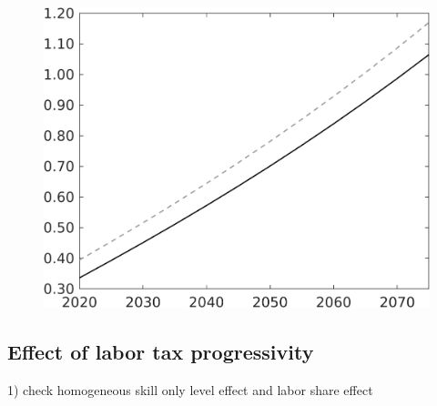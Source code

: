 \begin{figure}[h!!]
\begin{minipage}[]{0.32\textwidth}
	\end{minipage}		
	\begin{minipage}[]{0.32\textwidth}
		\includegraphics[width=1\textwidth]{../../codding_model/own_basedOnFried/optimalPol_010922_revision/figures/all_13Sept22/CompTaul_Reg0_C_spillover0_nsk0_xgr0_sep1_LFlimit0_emsbase1_countec0_GovRev1_etaa0.79_lgd0.png}
	\end{minipage}	
\end{figure}

\subsection{Effect of labor tax progressivity}
1) check homogeneous skill \ar only level effect and labor share effect

